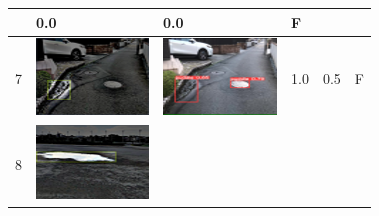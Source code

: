 \documentclass[10pt]{jarticle}
\begin{document}
\begin{table}[H]
\begin{tabular}{|l|l|l|l|l|l|}
\begin{minipage}{.1\textwidth}
           \end{minipage}       & 0.0 & 0.0 & F      \\ \hline
        7  & \begin{minipage}{.1\textwidth}
            \centering
            \includegraphics[width=0.9\linewidth]{./fig/tab7_a.png}
           \end{minipage}       & \begin{minipage}{.1\textwidth}
            \centering
            \includegraphics[width=0.9\linewidth]{./fig/tab7_r.png}
           \end{minipage}       & 1.0 & 0.5 & F      \\ \hline
        8  & \begin{minipage}{.1\textwidth}
            \centering
            \includegraphics[width=0.9\linewidth]{./fig/tab8_a.png}

\end{minipage}
\end{tabular}
\end{table}
\end{document}
